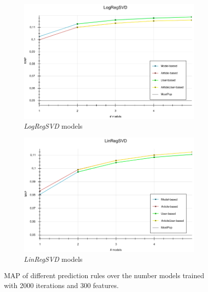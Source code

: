 \documentclass[10pt]{reportMaster}
\begin{document}
\begin{figure}[h!]
	\begin{subfigure}[c]{0.9\textwidth}
		\centering
		\includegraphics[width=1\textwidth]{figures/experiments/LogRegSVDPredictionsOModels}
		\caption[\textit{LogRegSVD} models]{\textit{LogRegSVD} models}
		\label{fig:LogRegSVDPredictionsOModels}
	\end{subfigure}
	\begin{subfigure}[c]{0.9\textwidth}
		\centering
		\includegraphics[width=1\textwidth]{figures/experiments/LinRegSVDPredictionsOModels}
		\caption[\textit{LinRegSVD} models]{\textit{LinRegSVD} models}
		\label{fig:LinRegSVDPredictionsOModels}
	\end{subfigure}
	\caption[MAPs for different prediction rules]{MAP of different prediction rules over the number models trained with 2000 iterations and 300 features.}
	\label{fig:SVDPredictionOModels}
\end{figure}
\end{document}
